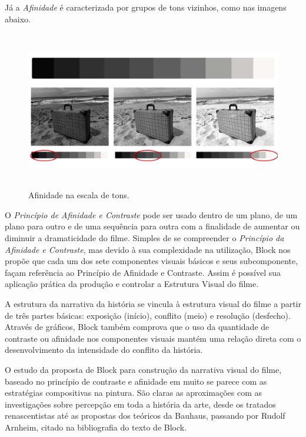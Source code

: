 Já a \emph{Afinidade} é caracterizada por grupos de tons vizinhos, como
nas imagens abaixo.

\begin{figure}
	\caption{Afinidade na escala de tons.}
	\includegraphics[width=5.40139in,height=2.72361in]{figuras/afinidade-escala-tons.pdf.compressed.pdf}
\end{figure}

O \emph{Princípio de Afinidade e Contraste} pode ser usado dentro de um
plano, de um plano para outro e de uma sequência para outra com a
finalidade de aumentar ou diminuir a dramaticidade do filme. Simples de
se compreender o \emph{Princípio da Afinidade e Contraste}, mas devido à sua
complexidade na utilização, Block nos propõe que cada um dos sete
componentes visuais básicos e seus subcomponente, façam referência ao
Princípio de Afinidade e Contraste. Assim é possível sua aplicação
prática da produção e controlar a Estrutura Visual do filme.

A estrutura da narrativa da história se vincula à estrutura visual do
filme a partir de três partes básicas: exposição (início), conflito
(meio) e resolução (desfecho). Através de gráficos, Block também
comprova que o uso da quantidade de contraste ou afinidade nos
componentes visuais mantém uma relação direta com o desenvolvimento da
intensidade do conflito da história.

O estudo da proposta de Block para construção da narrativa visual do
filme, baseado no princípio de contraste e afinidade em muito se parece
com as estratégias compositivas na pintura. São claras as aproximações
com as investigações sobre percepção em toda a história da arte, desde
os tratados renascentistas até as propostas dos teóricos da Bauhaus,
passando por Rudolf Arnheim, citado na bibliografia do texto de Block.

